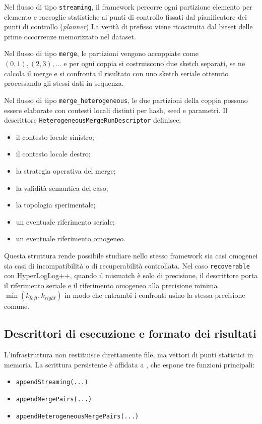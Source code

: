 Nel flusso di tipo \texttt{streaming}, il framework percorre ogni partizione
elemento per elemento e raccoglie statistiche ai punti di controllo fissati dal
pianificatore dei punti di controllo (\emph{planner})
La verità di prefisso viene ricostruita dal bitset delle prime occorrenze
memorizzato nel dataset.

Nel flusso di tipo \texttt{merge}, le partizioni vengono accoppiate come
\((0,1),(2,3),\dots\) e per ogni coppia si costruiscono due sketch separati,
se ne calcola il merge e si confronta il risultato con uno sketch seriale
ottenuto processando gli stessi dati in sequenza.

Nel flusso di tipo \texttt{merge\_heterogeneous}, le due partizioni della coppia
possono essere elaborate con contesti locali distinti per hash, seed e
parametri. Il descrittore \texttt{HeterogeneousMergeRunDescriptor} definisce:
\begin{itemize}
    \item il contesto locale sinistro;
    \item il contesto locale destro;
    \item la strategia operativa del merge;
    \item la validità semantica del caso;
    \item la topologia sperimentale;
    \item un eventuale riferimento seriale;
    \item un eventuale riferimento omogeneo.
\end{itemize}

Questa struttura rende possibile studiare nello stesso framework sia casi
omogenei sia casi di incompatibilità o di recuperabilità controllata.
Nel caso \texttt{recoverable} con HyperLogLog++, quando il mismatch è solo di
precisione, il descrittore porta il riferimento seriale e il riferimento
omogeneo alla precisione minima \(\min(k_{left}, k_{right})\) in modo che
entrambi i confronti usino la stessa precisione comune.

\subsection{Descrittori di esecuzione e formato dei risultati}

L'infrastruttura non restituisce direttamente file, ma vettori di punti
statistici in memoria. La scrittura persistente è affidata a
, che espone tre funzioni principali:
\begin{itemize}
    \item \texttt{appendStreaming(...)}
    \item \texttt{appendMergePairs(...)}
    \item \texttt{appendHeterogeneousMergePairs(...)}
\end{itemize}

